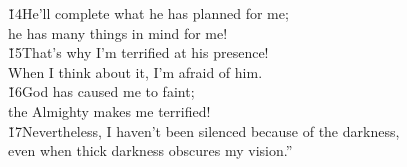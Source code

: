 \begin{poetry}
\poeml \v{14}He'll complete what he has planned for me; \\
\poemll    he has many things in mind for me! \\
\poeml \v{15}That's why I'm terrified at his presence! \\
\poemll    When I think about it, I'm afraid of him. \\
\poeml \v{16}God has caused me to faint; \\
\poemll    the Almighty makes me terrified! \\
\poeml \v{17}Nevertheless, I haven't been silenced because of the darkness, \\
\poemll    even when thick darkness obscures my vision.''
\end{poetry}

